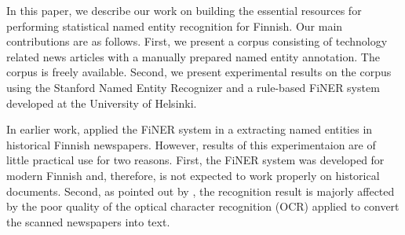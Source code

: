 \documentclass[11pt]{article}
\begin{document}

In this paper, we describe our work on building the essential resources for performing statistical named entity recognition for Finnish. Our main contributions are as follows. First, we present a corpus consisting of technology related news articles with a manually prepared named entity annotation. The corpus is freely available. Second, we present experimental results on the corpus using the Stanford Named Entity Recognizer \citep{finkel2005} and a rule-based FiNER system developed at the University of Helsinki.

In earlier work, \citet{kettunen2016} applied the FiNER system in a extracting named entities in historical Finnish newspapers. However, results of this experimentaion are of little practical use for two reasons. First, the FiNER system was developed for modern Finnish and, therefore, is not expected to work properly on historical documents. Second, as pointed out by \citep{kettunen2016}, the recognition result is majorly affected by the poor quality of the optical character recognition (OCR) applied to convert the scanned newspapers into text.


\end{document}

